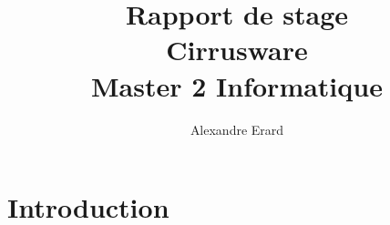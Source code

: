 \documentclass[french]{article}
\title{
    Rapport de stage\\
    \large Cirrusware \\
    \large Master 2 Informatique
    }
\author{
    Alexandre Erard
}
\begin{document}
\maketitle
\newpage

\section{Introduction}
\end{document}
